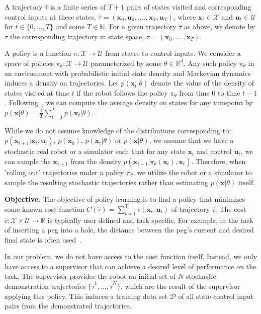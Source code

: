 \documentclass[10pt, conference]{ieeeconf}      %
\newcommand{\bu}{\mathbf{u}}
\newcommand{\bx}{\mathbf{x}}
\begin{document}
A trajectory $\hat{\tau}$ is a finite series of $T+1$ pairs of states visited and corresponding
control inputs at these states, $\hat{\tau} = (\mathbf{x}_0,\mathbf{u}_0, ...., \mathbf{x}_T,\mathbf{u}_T)$, where $\bx_t\in \mathcal{X}$
and $\bu_t\in \mathcal{U}$ for $t\in \{0, \ldots, T\}$ and some $T\in \mathbb{N}$.  
For a given trajectory $\hat{\tau}$ as above, we denote by ${\tau}$ the corresponding trajectory in state space,
${\tau} = (\bx_0,....,\bx_T)$.


A policy is a function $\pi: \mathcal{X} \to \mathcal{U}$ from states to control inputs. 
We consider a space of policies $\pi_{\theta}:\mathcal{X}\to \mathcal{U}$ parameterized by some $\theta\in \mathbb{R}^d$. Any such policy $\pi_{\theta}$ in an environment with probabilistic initial state density and Markovian dynamics
induces a density on trajectories. Let $p(\bx_t|\theta)$ denote the value of the density of states visited at time $t$ if the robot follows the policy
$\pi_{\theta}$ from time $0$ to time $t-1$.  Following~\cite{ross2010reduction}, we can compute
the average density on states for any timepoint by $p(\bx|\theta) = \frac{1}{T} \sum^T_{t=1} p(\bx_t|\theta)$.


While we do not assume knowledge of the distributions corresponding to: $p(\bx_{t+1}|\bx_t,\bu_t)$, $p(\bx_0)$, $p(\bx_t|
\theta)$ or $p(\bx|\theta)$, we assume that we have a stochastic real robot or a simulator such that for any state
$\bx_t$ and control $\bu_t$, we can sample the $\bx_{t+1}$ from the density $p(\bx_{t+1}|\pi_{\theta}(\bx_t),\bx_t)$. 
Therefore, when 'rolling out' trajectories under a policy
$\pi_{\theta}$, we utilize the robot or a simulator to sample the resulting stochastic trajectories rather than
estimating $p(\bx|\theta)$ itself.

\noindent\textbf{Objective.} The objective of  policy learning is to find a policy that minimizes some known cost function $C(\hat{\tau}) = \sum^T_{t=1} c(\bx_t,\bu_t)$ of trajectory $\hat{\tau}$. The cost $c:\mathcal{X}\times \mathcal{U}\to \mathbb{R}$ is typically user defined and task specific. 
For example, in the task of inserting a peg into a hole, the distance between the peg's current and desired final state is often used~\cite{levine2015end}.  

In our problem, we do not have access to the cost function itself. Instead, we only have access to 
a supervisor that can achieve a desired level of performance on the task. The supervisor provides the robot
an initial set of $N$ stochastic demonstration trajectories $\lbrace \tilde{\tau}^1,...,\tilde{\tau}^N \rbrace$. 
which are the result of the supervisor applying this policy. This induces a training data set $\mathcal{D}$ of all state-control input pairs from the demonstrated trajectories. 
\end{document}
